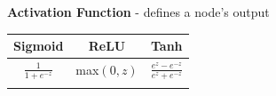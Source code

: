 \documentclass[10pt,landscape]{article}
\begin{document}
\begin{multicols}{3}
    \textbf{Activation Function} - defines a node's output

    \vspace{-1mm}
    \begin{center}
        \begin{tabular}{c|c|c}
            Sigmoid                                             & ReLU       & Tanh                                \\
            \hline
            \rule{0pt}{3ex}
            $\frac{1}{1+e^{-z}} $                               & max$(0,z)$ & $\frac{e^z - e^{-z}}{e^z + e^{-z}}$ \\
                                                                &            & \vspace{-2mm}                       \\


\end{tabular}
\end{center}
\end{multicols}
\end{document}
